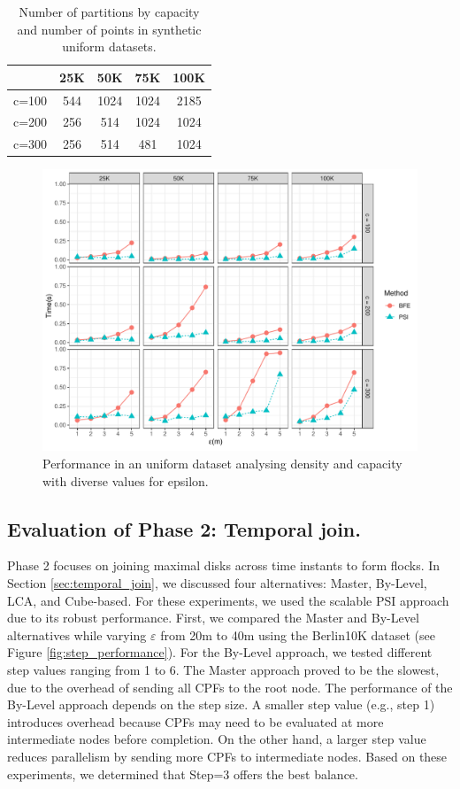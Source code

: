 \begin{table}
    \centering
    \caption{Number of partitions by capacity and number of points in synthetic uniform datasets.}
    \label{tab:uniform_ncells}
    \begin{tabular}{c|cccc}
              & 25K & 50K  & 75K  & 100K \\
        \hline
        c=100 & 544 & 1024 & 1024 & 2185 \\
        c=200 & 256 & 514  & 1024 & 1024 \\
        c=300 & 256 & 514  & 481  & 1024 \\
    \end{tabular}
\end{table}

\begin{figure}
    \centering
    \includegraphics[width=\linewidth]{chapterPFlocks/figures/plots/05_uniform_performance/uniform_performance.pdf}
    \caption{Performance in an uniform dataset analysing density and capacity with diverse values for epsilon.}\label{fig:uniform_performance}
\end{figure}

\subsection{Evaluation of Phase 2: Temporal join.}
Phase 2 focuses on joining maximal disks across time instants to form flocks. In Section \ref{sec:temporal_join}, we discussed four alternatives: Master, 
By-Level, LCA, and Cube-based. For these experiments, we used the scalable PSI approach due to its robust performance.
First, we compared the Master and By-Level alternatives while varying $\varepsilon$ from 20m to 40m using the Berlin10K dataset (see Figure 
\ref{fig:step_performance}). For the By-Level approach, we tested different step values ranging from 1 to 6. The Master approach proved to be the slowest, due 
to the overhead of sending all CPFs to the root node. The performance of the By-Level approach depends on the step size. A smaller step value (e.g., step 1) 
introduces overhead because CPFs may need to be evaluated at more intermediate nodes before completion. On the other hand, a larger step value reduces 
parallelism by sending more CPFs to intermediate nodes. Based on these experiments, we determined that Step=3 offers the best balance.

